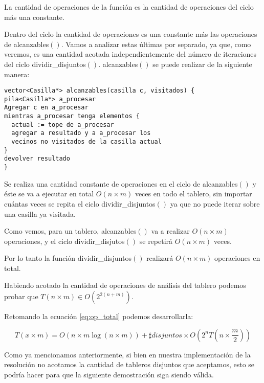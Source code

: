 \documentclass[a4paper, 12pt] {article}
\begin{document}
La cantidad de operaciones de la funci\'on es la cantidad de operaciones del ciclo m\'as una constante. 


Dentro del ciclo la cantidad de operaciones es una constante m\'as las operaciones de alcanzables$\left( \right) $. Vamos a analizar estas \'ultimas por separado, ya que, como veremos, es una cantidad acotada independientemente del n\'umero de iteraciones del ciclo dividir\_disjuntos$\left( \right) $.
alcanzables$\left( \right) $ se puede realizar de la siguiente manera:

\begin{verbatim}
vector<Casilla*> alcanzables(casilla c, visitados) {
pila<Casilla*> a_procesar
Agregar c en a_procesar
mientras a_procesar tenga elementos {
  actual := tope de a_procesar
  agregar a resultado y a a_procesar los 
  vecinos no visitados de la casilla actual
}
devolver resultado
}
\end{verbatim}

Se realiza una cantidad constante de operaciones en el ciclo de alcanzables$\left( \right) $ y \'este se va a ejecutar en total $O\left( n\times m\right) $ veces en todo el tablero, sin importar cu\'antas veces se repita el ciclo dividir\_disjuntos$\left( \right) $ ya que no puede iterar sobre una casilla ya visitada.

Como vemos, para un tablero, alcanzables$\left( \right) $ va a realizar $O\left( n \times m\right) $ operaciones, y el ciclo dividir\_disjutos$\left( \right) $ se repetir\'a $O\left( n\times m\right) $ veces.

Por lo tanto la funci\'on dividir\_disjuntos$\left( \right) $ realizar\'a $O\left( n \times m\right) $ operaciones en total.	


Habiendo acotado la cantidad de operaciones de an\'alisis del tablero podemos probar que $T\left( n \times m\right) \in O\left( 2^{2\left( n+m\right) }\right) $.

Retomando la ecuaci\'on \ref{eq:op_total} podemos desarrollarla:

\begin{equation}
T\left( x \times m\right) = O\left( n\times m \log \left( n\times m\right) \right) + \sharp disjuntos \times O \left( 2^{n}T\left( n \times \frac{m}{2} \right) \right) 
\end{equation}
 

Como ya mencionamos anteriormente, si bien en nuestra implementaci\'on de la resoluci\'on no acotamos la cantidad de tableros disjuntos que aceptamos, esto se podr\'ia hacer para que la siguiente demostraci\'on siga siendo v\'alida.
\end{document}
